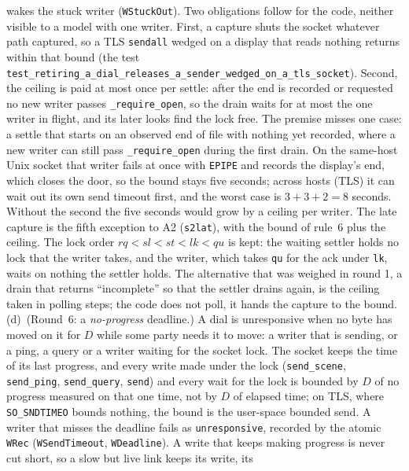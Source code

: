 \documentclass[a4paper,10pt,fleqn]{article}
\begin{document}
\begin{enumerate}
    wakes the stuck writer (\texttt{WStuckOut}).  Two obligations follow for the
    code, neither visible to a model with one writer.  First, a capture shuts
    the socket whatever path captured, so a TLS \texttt{sendall} wedged on a
    display that reads nothing returns within that bound (the test
    \texttt{test\_retiring\_a\_dial\_releases\_a\_sender\_wedged\_on\_a\_tls\_socket}).
    Second, the ceiling is paid at most once per settle: after the end is
    recorded or requested no new writer passes \texttt{\_require\_open}, so the
    drain waits for at most the one writer in flight, and its later looks find
    the lock free.  The premise misses one case: a settle that starts on an
    observed end of file with nothing yet recorded, where a new writer can still
    pass \texttt{\_require\_open} during the first drain.  On the same-host Unix
    socket that writer fails at once with \texttt{EPIPE} and records the display's
    end, which closes the door, so the bound stays five seconds; across hosts
    (TLS) it can wait out its own send timeout first, and the worst case is
    $3 + 3 + 2 = 8$ seconds.  Without the second the five seconds would grow by a ceiling
    per writer.
    The late capture is the fifth exception to A2 (\texttt{s2lat}), with
    the bound of rule~6 plus the ceiling.  The lock order
    $rq < sl < st < lk < qu$ is kept: the waiting settler holds no lock that the
    writer takes, and the writer, which takes \texttt{qu} for the ack under
    \texttt{lk}, waits on nothing the settler holds.  The alternative that was
    weighed in round 1, a drain that returns ``incomplete'' so that the settler
    drains again, is the ceiling taken in polling steps; the code does not poll,
    it hands the capture to the bound.
    (d)~(Round~6: a \emph{no-progress} deadline.)  A dial is unresponsive when no
    byte has moved on it for $D$ while some party needs it to move: a writer
    that is sending, or a ping, a query or a writer waiting for the socket
    lock.  The socket keeps the time of its last progress, and every write made
    under the lock (\texttt{send\_scene}, \texttt{send\_ping},
    \texttt{send\_query}, \texttt{send}) and every wait for the lock is bounded
    by $D$ of no progress measured on that one time, not by $D$ of elapsed time;
    on TLS, where \texttt{SO\_SNDTIMEO} bounds nothing, the bound is the
    user-space bounded send.  A writer that misses the deadline fails as
    \texttt{unresponsive}, recorded by the atomic \texttt{WRec}
    (\texttt{WSendTimeout}, \texttt{WDeadline}).  A write that keeps making
    progress is never cut short, so a slow but live link keeps its write, its

\end{enumerate}
\end{document}
